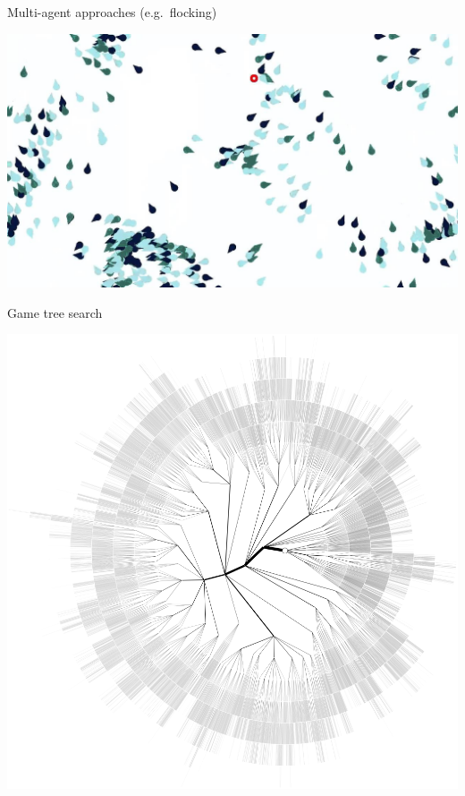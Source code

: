 \begin{frame}{Multi-agent approaches (e.g.\ flocking)}
	\begin{center}
		\includegraphics[width=\textwidth]{flocking}
	\end{center}
\end{frame}

\begin{frame}{Game tree search}
	\begin{center}
		\includegraphics[height=0.7\textheight]{mcts}
	\end{center}
\end{frame}

